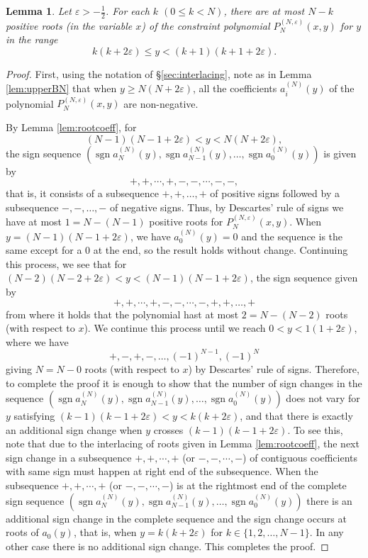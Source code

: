 \documentclass[11pt]{article}
\numberwithin{equation}{section}
\newcommand{\e}{\varepsilon}
\newcommand{\cp}[2]{P^{(#1)}_{#2}} %
\DeclareMathOperator{\sgn}{sgn}
\theoremstyle{plain}
\newtheorem{lem}[thm]{Lemma}
\theoremstyle{definition}
\theoremstyle{remark}
\begin{document}
\begin{lem}
  \label{lem:Upperbound}
  Let \( \e > -\frac12 \). For each $k$ $(0\leq k <N)$, there are at most $N-k$ positive roots
  (in the variable $x$) of the constraint polynomial \(\cp{N,\e}{N}(x,y)\)
  for $y$ in the range
  \begin{equation*}
     k(k+2\e) \leq y < (k+1)(k+1 +2\e).
  \end{equation*}
\end{lem}

\begin{proof}
  First, using the notation of \S \ref{sec:interlacing}, note as in Lemma \ref{lem:upperBN} that
  when \(y \geq N(N + 2\e)\), all the coefficients \(a_i^{(N)}(y)\) of the polynomial \(\cp{N,\e}{N}(x,y)\) are
  non-negative.

  By Lemma \ref{lem:rootcoeff}, for
  \[(N-1)(N-1+2\e) < y < N(N + 2\e),\]
  the sign sequence \((\sgn a_N^{(N)}(y), \sgn a_{N-1}^{(N)}(y), \ldots, \sgn a_0^{(N)}(y))\) is given by
  \[
    +,+,\cdots,+,-,-,\cdots,-,-,
  \]
  that is, it consists of a subsequence \(+,+,\ldots,+\) of positive signs followed by a subsequence \(-,-,\ldots,- \) of negative
  signs. Thus,  by Descartes' rule of signs we have at most \(1 = N - (N-1)\) positive roots for \(\cp{N,\e}{N}(x,y)\).
  When \(y = (N-1)(N-1+2\e)\), we have \(a_0^{(N)}(y)=0 \) and the sequence is the same except for a \(0\) at the end,
  so the result holds without change. Continuing this process, we see that for
  \((N-2)(N-2+2\e) < y < (N-1)(N-1 + 2\e)\), the sign sequence given by
  \[
    +,+,\cdots,+,-,-,\cdots,-,+,+,\ldots,+
  \]
  from where it holds that the polynomial hast at most \(2 = N-(N-2)\) roots (with respect to \(x\)).
  We continue this process until we reach \(0 < y < 1(1 + 2\e)\), where we have
  \[
    +,-,+,-,\ldots,(-1)^{N-1},(-1)^{N}
  \]
  giving \(N = N- 0\) roots (with respect to \(x\)) by Descartes' rule of signs. Therefore, to complete the proof
  it is enough to show that the number of sign changes in the sequence
  \((\sgn a_N^{(N)}(y),\sgn a_{N-1}^{(N)}(y),\ldots,\sgn a_0^{(N)}(y))\) does not vary for \(y\) satisfying
  \((k-1)(k-1+2\e) < y < k(k + 2\e)\), and that there is exactly an additional sign change when \(y\) crosses
  \((k-1)(k-1+2\e)\). To see this, note that due to the interlacing of roots given in Lemma \ref{lem:rootcoeff}, the next
  sign change in a subsequence \(+,+,\cdots,+\) (or \(-,-,\cdots,-\)) of contiguous coefficients with same sign must happen at right
  end of the subsequence. When the subsequence \(+,+,\cdots,+\) (or \(-,-,\cdots,-\)) is at the rightmost end of the complete sign sequence
  \((\sgn a_N^{(N)}(y),\sgn a_{N-1}^{(N)}(y),\ldots,\sgn a_0^{(N)}(y))\) there is an additional sign change in the complete sequence and
  the sign change occurs at roots of \(a_0(y)\), that is, when \( y = k(k+2\e)\) for \(k \in \{1,2,\ldots,N-1\} \). In any other case there
  is no additional sign change. This completes the proof. 
\end{proof}
\end{document}
